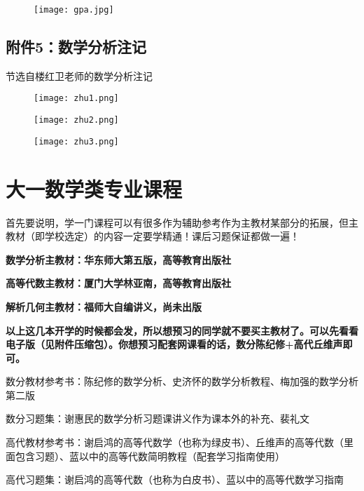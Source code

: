 \documentclass{my_paper}
\begin{document}
\begin{figure}[H]
	\centering
	\texttt{[image: gpa.jpg]}
\end{figure} 

\newpage

\subsection{附件5：数学分析注记}\label{f5}
节选自楼红卫老师的数学分析注记

\begin{figure}[H]
	\centering
	\texttt{[image: zhu1.png]}
\end{figure} 

\begin{figure}[htbp]
	\centering
	\texttt{[image: zhu2.png]}
\end{figure} 

\begin{figure}[htbp]
	\centering
	\texttt{[image: zhu3.png]}
\end{figure} 


\newpage

\section{大一数学类专业课程}\label{sug}
首先要说明，学一门课程可以有很多作为辅助参考作为主教材某部分的\textcolor[rgb]{1,0,0}{拓展}，但\textcolor[rgb]{1,0,0}{主教材}（即学校选定）的内容一定要学精通！课后习题保证都做一遍！

\textbf{数学分析主教材：华东师大第五版，高等教育出版社}

\textbf{高等代数主教材：厦门大学林亚南，高等教育出版社}

\textbf{解析几何主教材：福师大自编讲义，尚未出版}

\textbf{以上这几本开学的时候都会发，所以想预习的同学就不要买主教材了。可以先看看电子版（见附件压缩包）。你想预习配套网课看的话，数分陈纪修+高代丘维声即可。}

数分教材参考书：陈纪修的数学分析、史济怀的数学分析教程、梅加强的数学分析第二版

数分习题集：\textcolor[rgb]{1,0,0}{谢惠民}的数学分析习题课讲义作为课本外的补充、裴礼文

高代教材参考书：谢启鸿的高等代数学（也称为绿皮书）、丘维声的高等代数（里面包含习题）、蓝以中的高等代数简明教程（配套学习指南使用）

高代习题集：谢启鸿的高等代数（也称为白皮书）、蓝以中的高等代数学习指南
\end{document}
